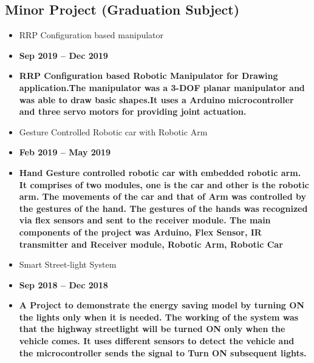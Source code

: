 \documentclass[letterpaper]{twentysecondcv} %
\begin{document}
\subsection{Minor Project (Graduation Subject)}
\begin{itemize}
    \item {RRP Configuration based manipulator}
    \item[]\textbf{Sep 2019 -- Dec 2019}
    \item[] \textbf{RRP Configuration based Robotic Manipulator for Drawing application.The manipulator was a 3-DOF planar manipulator and was able to draw basic shapes.It uses a Arduino microcontroller and three servo motors for providing joint actuation.}
    \item {Gesture Controlled Robotic car with Robotic Arm}
    \item[] \textbf{Feb 2019 -- May 2019 }
    \item[] \textbf{Hand Gesture controlled robotic car with embedded robotic arm. It comprises of two modules, one is the car and other is the robotic arm. The movements of the car and that of Arm was controlled by the gestures of the hand. The gestures of the hands was recognized via flex sensors and sent to the receiver module. The main components of the project was Arduino, Flex Sensor, IR transmitter and Receiver module, Robotic Arm, Robotic Car}
    \item {Smart Street-light System}
    \item[] \textbf{Sep 2018 -- Dec 2018}
    \item[] \textbf{A Project to demonstrate the energy saving model by turning ON the lights only when it is needed. The working of the system was that the highway streetlight will be turned ON only when the vehicle comes. It uses different sensors to detect the vehicle and the microcontroller sends the signal to Turn ON subsequent lights.}
\end{itemize}
\newpage %
\makeprofile %
\end{document}
